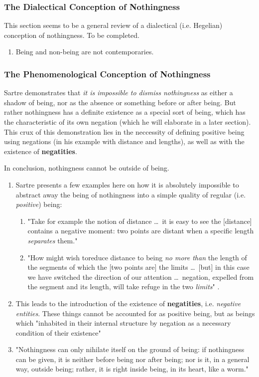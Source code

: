\subsubsection{The Dialectical Conception of Nothingness}
This section seems to be a general review of a dialectical (i.e. Hegelian) conception of nothingness. To be completed.

\begin{enumerate}
  \item Being and non-being are not contemporaries.
\end{enumerate}

\subsubsection{The Phenomenological Conception of Nothingness}

Sartre demonstrates that \emph{it is impossible to dismiss nothingness} as either a shadow of being, nor as the absence or something before or after being. But rather nothingness has a definite existence as a special sort of being, which has the characteristic of its own negation (which he will elaborate in a later section). This crux of this demonstration lies in the neccessity of defining positive being using negations (in his example with distance and lengths), as well as with the existence of \textbf{negatities}.

\noindent
In conclusion, nothingness cannot be outside of being.

\begin{enumerate}
  \item Sartre presents a few examples here on how it is absolutely impossible to abstract away the being of nothingness into a simple quality of regular (i.e. \emph{positive}) being:
  \begin{enumerate}
    \item "Take for example the notion of distance \ldots\ it is easy to see the [distance] contains a negative moment: two points are distant when a specific length \emph{separates} them."
    \item "How might wish toreduce distance to being \emph{no more than} the length of the segments of which the [two points are] the limits \ldots\ [but] in this case we have switched the direction of our attention \ldots\ negation, expelled from the segment and its length, will take refuge in the two \emph{limits}" \autocite[55]{sartre}.
  \end{enumerate}
  \item This leads to the introduction of the existence of \textbf{negatities}, i.e. \emph{negative entities}. These things cannot be accounted for as positive being, but as beings which "inhabited in their internal structure by negation as a necessary condition of their existence" \autocite[56]{sartre}
  \item "Nothingness can only nihilate itself on the ground of being: if nothingness can be given, it is neither before being nor after being; nor is it, in a general way, outside being; rather, it is right inside being, in its heart, like a worm." \autocite[57]{sartre}
\end{enumerate}

